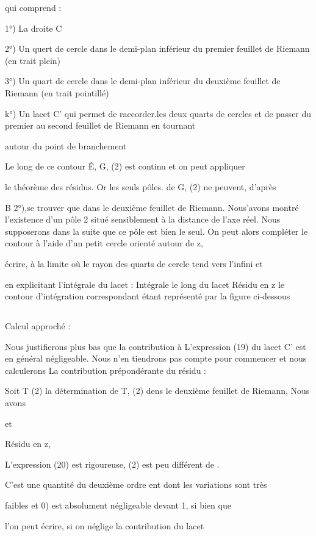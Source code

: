 qui comprend :

1°) La droite C

2°) Un quert de cercle dans le demi-plan inférieur du premier
feuillet de Riemann (en trait plein)

3°) Un quart de cercle dans le demi-plan inférieur du deuxième
feuillet de Riemann (en trait pointillé)

k°) Un lacet C' qui permet de raccorder.les deux quarts de
cercles et de passer du premier au second feuillet de Riemann en tournant

autour du point de branchement

Le long de ce contour Ê, G, (2) est continu et on peut appliquer

le théorème des résidus. Or les seuls pôles. de G, (2) ne peuvent, d'après

 B 2°),se trouver que dans le deuxième feuillet de Riemann. Nous’avons montré
l'existence d'un pôle 2 situé sensiblement à la distance de l'axe réel.
Nous supposerons dans la suite que ce pôle est bien le seul. On peut alors compléter le contour  à l'aide d'un petit cercle orienté autour de z,

écrire, à la limite où le rayon des quarts de cercle tend vers l'infini et

en explicitant l'intégrale du lacet :
Intégrale le long du lacet
Résidu en z
le contour d'intégration correspondant étant représenté par la figure ci-dessous
\subsection{} Calcul approché :%

Nous justifierons plus bas que la contribution à L'expression (19) du lacet C' est en général négligeable. Nous n'en tiendrons pas
compte pour commencer et nous calculerons La contribution prépondérante du
résidu :

Soit T (2) la détermination de T, (2) dens le deuxième feuillet
de Riemann, Nous avons


et

Résidu en z,

L'expression (20) est rigoureuse, (2) est peu différent de .

C'est une quantité du deuxième ordre ent dont les variations sont très

faibles et 0) est absolument négligeable devant 1, si bien que

l'on peut écrire, si on néglige la contribution du lacet

